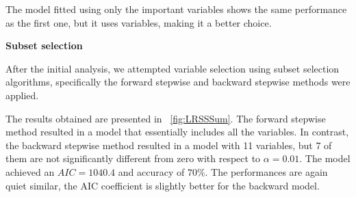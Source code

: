 The model fitted using only the important variables shows the same performance as the first one, but it uses variables, making it a better choice.

\vspace{0.2cm}
\textbf{Subset selection}

After the initial analysis, we attempted variable selection using subset selection algorithms, specifically the forward stepwise and backward stepwise methods were applied. 

The results obtained are presented in \Fig~\ref{fig:LRSSSum}. The forward stepwise method resulted in a model that essentially includes all the variables. In contrast, the backward stepwise method resulted in a model with 11 variables, but 7 of them are not significantly different from zero with respect to $\alpha = 0.01$. The model achieved an $AIC = 1040.4$ and accuracy of $70\%$. The performances are again quiet similar, the AIC coefficient is slightly better for the backward model.

